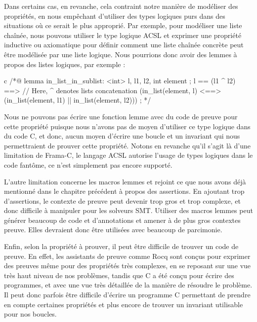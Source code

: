 Dans certains cas, en revanche, cela contraint notre manière de modéliser des
propriétés, en nous empêchant d'utiliser des types logiques purs dans des
situations où ce serait le plus approprié. Par exemple,
pour modéliser une liste chaînée, nous pouvons utiliser le type logique ACSL
 et exprimer une propriété inductive ou
axiomatique pour définir comment une liste chaînée concrète peut être modélisée
par une liste logique. Nous pourrions donc avoir des lemmes à propos des listes
logiques, par exemple :

\begin{CodeBlock}{c}
/*@
  lemma in_list_in_sublist:
    \forall \list<int> l, l1, l2, int element ;
      l == (l1 ^ l2) ==>      // Here, ^ denotes lists concatenation
      (in_list(element, l) <==> (in_list(element, l1) || in_list(element, l2))) ;
*/
\end{CodeBlock}


Nous ne pouvons pas écrire une fonction lemme avec du code de preuve
pour cette propriété puisque nous n'avons pas de moyen d'utiliser ce type logique
dans du code C, et donc, aucun moyen d'écrire une boucle et un invariant qui nous
permettraient de prouver cette propriété. Notons en revanche qu'il s'agit là
d'une limitation de Frama-C, le langage ACSL autorise l'usage de types logiques
dans le code fantôme, ce n'est simplement pas encore supporté.



L'autre limitation concerne les macros lemmes et rejoint ce que nous avons déjà
mentionné dans le chapitre précédent à propos des assertions. En ajoutant trop
d'assertions, le contexte de preuve peut devenir trop gros et trop complexe, et
donc difficile à manipuler pour les solveurs SMT. Utiliser des
macros lemmes peut générer beaucoup de code et d'annotations et amener
à de plus gros contextes preuve. Elles devraient
donc être utilisées avec beaucoup de parcimonie.


Enfin, selon la propriété à prouver, il peut être difficile de trouver un
code de preuve. En effet, les assistants de preuve comme Rocq sont conçus pour
exprimer des preuves même pour des propriétés très complexes,
en se reposant sur une vue très haut niveau de nos problèmes, tandis que C a été
conçu pour écrire des programmes, et avec une vue très détaillée de la manière de
résoudre le problème. Il peut donc parfois être difficile d'écrire un programme
C permettant de prendre en compte certaines propriétés et plus encore de trouver
un invariant utilisable pour nos boucles.


